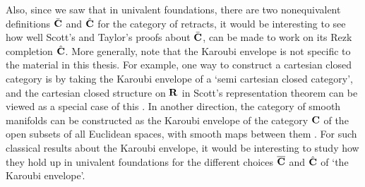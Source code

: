 Also, since we saw that in univalent foundations, there are two nonequivalent definitions $ \bar {\mathbf{C}} $ and $ \hat {\mathbf{C}} $ for the category of retracts, it would be interesting to see how well Scott's and Taylor's proofs about $ \bar {\mathbf{C}} $, can be made to work on its Rezk completion $ \hat {\mathbf{C}} $. More generally, note that the Karoubi envelope is not specific to the material in this thesis. For example, one way to construct a cartesian closed category is by taking the Karoubi envelope of a `semi cartesian closed category', and the cartesian closed structure on $ \mathbf{R} $ in Scott's representation theorem can be viewed as a special case of this \autocite{hayashi-1985-semifunctors}. In another direction, the category of smooth manifolds can be constructed as the Karoubi envelope of the category $ \mathbf{C} $ of the open subsets of all Euclidean spaces, with smooth maps between them \autocite[][267]{Lawvere-Karoubi}. For such classical results about the Karoubi envelope, it would be interesting to study how they hold up in univalent foundations for the different choices $ \overline {\mathbf{C}} $ and $ \hat {\mathbf{C}} $ of `the Karoubi envelope'.
